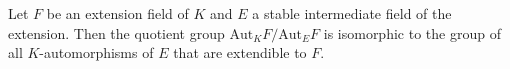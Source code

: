 Let $F$ be an extension field of $K$ and $E$ a stable intermediate field of the extension. Then the quotient group $\mathrm{Aut}_K F / \mathrm{Aut}_E F$ is isomorphic to the group of all $K$-automorphisms of $E$ that are extendible to $F$.
